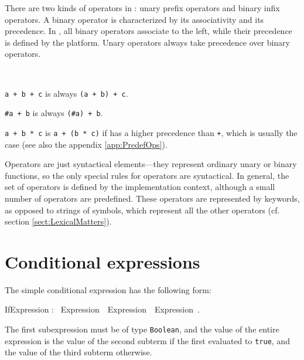There are two kinds of operators in \Cal: unary prefix operators and
binary infix operators. A binary operator is characterized by its
associativity and its precedence. In \Cal, all binary operators
associate to the left, while their precedence is defined by the
platform. Unary operators always take precedence over
binary operators.


\begin{example}\ 

  {\tt a + b + c} is always {\tt (a + b) + c}.

  {\tt \#a + b} is always {\tt (\#a) + b}.

  {\tt a + b * c} is {\tt a + (b * c)} if {\tt *} has a higher
  precedence than {\tt +}, which is usually the case (see also the
  appendix \ref{app:PredefOps}).
\end{example}

Operators are just syntactical elements---they represent ordinary
unary or binary functions, so the only special rules for operators are
syntactical. In general, the set of operators is defined by the
implementation context, although a small number of operators are
predefined. These operators are represented by keywords, as opposed to
strings of symbols, which represent all the other operators
(cf. section \ref{sect:LexicalMatters}).




\section{Conditional expressions}\label{sect:ConditionalExpression}


The simple conditional expression has the following form:


\bgr
  IfExpression : \kwIf~Expression~\kwThen~Expression~\kwElse~Expression~\kwEnd.
\egr

The first subexpression must be of type {\tt Boolean}, and the value
of the entire expression is the value of the second subterm if the
first evaluated to {\tt true}, and the value of the third subterm
otherwise.

